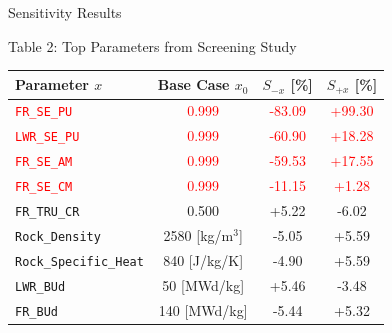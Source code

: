 \documentclass[pdf, autumn, slideColor, nocolorBG]{prosper}
\newcommand{\superscript}[1]{\ensuremath{^{\textrm{#1}}}}
\newcommand{\FigCaption}[1]{\begin{center}{\tiny{#1}}\end{center}}
\newcommand{\Red}[1]{\textcolor{red}{#1}}
\begin{document}
\begin{slide}{Sensitivity Results}

\small
\begin{center}
\FigCaption{Table 2: Top Parameters from Screening Study}
\begin{tabular}{|l|c|c|c|}
\hline
\textbf{Parameter $x$}        & \textbf{Base Case $x_0$}    & \textbf{$S_{-x}$} [\%] & \textbf{$S_{+x}$} [\%]\\
\hline
\Red{\texttt{FR\_SE\_PU}}     & \Red{0.999}                 & \Red{-83.09}      & \Red{+99.30} \\
\hline
\Red{\texttt{LWR\_SE\_PU}}    & \Red{0.999}                 & \Red{-60.90}      & \Red{+18.28} \\
\hline
\Red{\texttt{FR\_SE\_AM}}     & \Red{0.999}                 & \Red{-59.53}      & \Red{+17.55} \\
\hline
\Red{\texttt{FR\_SE\_CM}}     & \Red{0.999}                 & \Red{-11.15}      & \Red{+1.28}  \\
\hline
\texttt{FR\_TRU\_CR}          & 0.500                       & +5.22             & -6.02  \\
\hline
\texttt{Rock\_Density}        & 2580 [kg/m\superscript{3}]  & -5.05             & +5.59  \\
\hline
\texttt{Rock\_Specific\_Heat} & 840 [J/kg/K]                & -4.90             & +5.59  \\
\hline
\texttt{LWR\_BUd}             & 50 [MWd/kg]                 & +5.46             & -3.48  \\
\hline
\texttt{FR\_BUd}              & 140 [MWd/kg]                & -5.44             & +5.32  \\
\hline
\end{tabular}
\end{center}

\end{slide}
\end{document}
